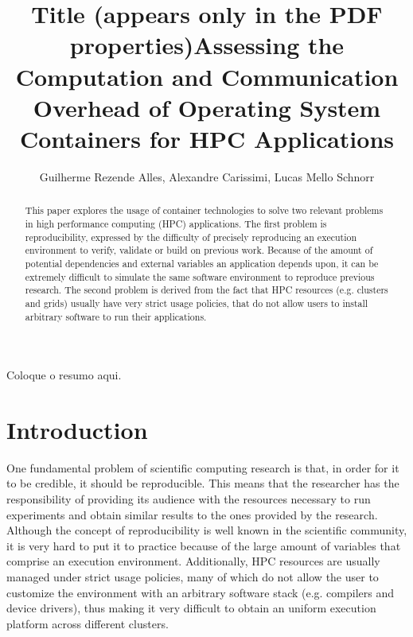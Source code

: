 \documentclass[12pt]{article}
\date{}
\title{Title (appears only in the PDF properties)}
\begin{document}
\sloppy

\title{Assessing the Computation and Communication Overhead of Operating System Containers for HPC Applications}

\author{
   Guilherme Rezende Alles,
   Alexandre Carissimi,
   Lucas Mello Schnorr}

\address{
   Graduate Program in Computer Science (PPGC/UFRGS), Porto Alegre, Brazil}

\maketitle

\begin{abstract}

This paper explores the usage of container technologies to solve two relevant problems in high performance computing (HPC) applications. The first problem is reproducibility, expressed by the difficulty of precisely reproducing an execution environment to verify, validate or build on previous work. Because of the amount of potential dependencies and external variables an application depends upon, it can be extremely difficult to simulate the same software environment to reproduce previous research. The second problem is derived from the fact that HPC resources (e.g. clusters and grids) usually have very strict usage policies, that do not allow users to install arbitrary software to run their applications.

\end{abstract}

\begin{resumo}

Coloque o resumo aqui.

\end{resumo}

\section{Introduction}
\label{sec:org50f2e33}

One fundamental problem of scientific computing research is that, in order for it to be credible, it should be reproducible. This means that the researcher has the responsibility of providing its audience with the resources necessary to run experiments and obtain similar results to the ones provided by the research. Although the concept of reproducibility is well known in the scientific community, it is very hard to put it to practice because of the large amount of variables that comprise an execution environment. Additionally, HPC resources are usually managed under strict usage policies, many of which do not allow the user to customize the environment with an arbitrary software stack (e.g. compilers and device drivers), thus making it very difficult to obtain an uniform execution platform across different clusters.
\end{document}
